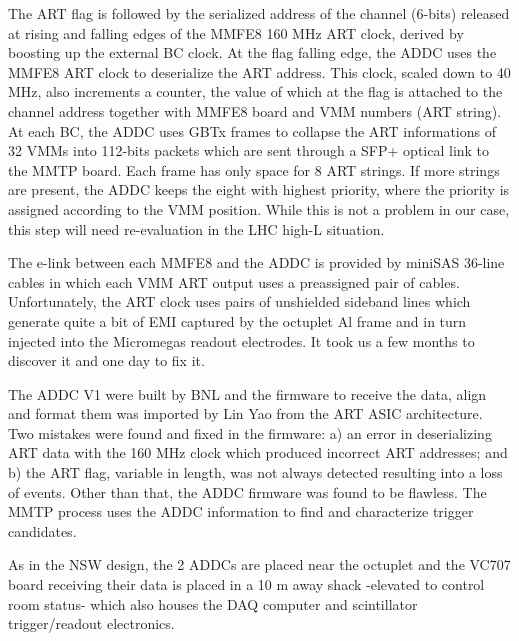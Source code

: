 The ART flag is followed by the serialized address of the channel (6-bits) released at rising and falling edges of the
 MMFE8 160 MHz ART clock,  derived by boosting up  the external BC clock.
At the flag falling edge,
the ADDC uses the MMFE8 ART clock to deserialize the ART address. This clock, scaled down to 40 MHz, also increments a counter, the value of which
at the flag  is attached to the channel address together with  MMFE8 board and VMM numbers (ART string). 
 At each  BC, the ADDC uses  GBTx frames to collapse the ART informations of 32 VMMs into 112-bits packets which
are sent through a SFP+ optical link to the MMTP board. Each frame has only space for 8 ART strings. If more strings are present,
 the ADDC keeps the eight with highest priority, where the priority is assigned according to the VMM position. While this is not a problem in our case,
this step will need re-evaluation in the LHC high-L situation.

 The  e-link between each MMFE8 and the ADDC is provided by miniSAS 36-line cables in which each VMM ART output uses a preassigned pair of cables.
 Unfortunately, the ART clock uses pairs of  unshielded sideband lines which generate quite a bit of
 EMI captured by the octuplet Al frame and in turn injected into the Micromegas readout electrodes.
 It took us a few months to discover it and one day to fix it.

  



  The ADDC V1 were built by BNL and the firmware to receive the data, align  and format them was imported by Lin Yao from the ART ASIC
architecture\cite{addc}.
 Two mistakes were found and fixed in the firmware: a) an error in deserializing ART data with the 160 MHz clock which produced
 incorrect ART addresses; and b) the ART flag, variable in length, was not always detected resulting into a loss of events.
 Other than that, the ADDC firmware was found to be flawless.
 The MMTP process uses the ADDC information to find and characterize trigger candidates.   

 
As in the NSW design, the 2 ADDCs are placed near the octuplet and the VC707 board receiving
 their data is placed in a 10 m away shack -elevated to control room status- 
 which also houses the DAQ computer and scintillator trigger/readout electronics. 

